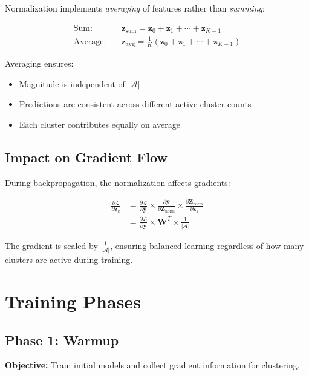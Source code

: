 \documentclass[11pt,a4paper]{article}
\begin{document}
Normalization implements \textit{averaging} of features rather than \textit{summing}:

\begin{align}
\text{Sum:} \quad &\mathbf{z}_{\text{sum}} = \mathbf{z}_0 + \mathbf{z}_1 + \cdots + \mathbf{z}_{K-1} \\
\text{Average:} \quad &\mathbf{z}_{\text{avg}} = \frac{1}{K}\left(\mathbf{z}_0 + \mathbf{z}_1 + \cdots + \mathbf{z}_{K-1}\right)
\end{align}

Averaging ensures:
\begin{itemize}
    \item Magnitude is independent of $|\mathcal{A}|$
    \item Predictions are consistent across different active cluster counts
    \item Each cluster contributes equally on average
\end{itemize}

\subsection{Impact on Gradient Flow}

During backpropagation, the normalization affects gradients:

\begin{align}
\frac{\partial \mathcal{L}}{\partial \mathbf{z}_k} &= \frac{\partial \mathcal{L}}{\partial \hat{\mathbf{y}}} \times \frac{\partial \hat{\mathbf{y}}}{\partial \mathbf{Z}_{\text{norm}}} \times \frac{\partial \mathbf{Z}_{\text{norm}}}{\partial \mathbf{z}_k} \\
&= \frac{\partial \mathcal{L}}{\partial \hat{\mathbf{y}}} \times \mathbf{W}^T \times \frac{1}{|\mathcal{A}|}
\end{align}

The gradient is scaled by $\frac{1}{|\mathcal{A}|}$, ensuring balanced learning regardless of how many clusters are active during training.

\section{Training Phases}

\subsection{Phase 1: Warmup}

\textbf{Objective:} Train initial models and collect gradient information for clustering.
\end{document}
